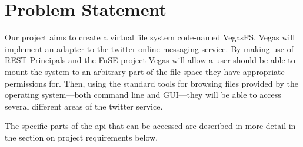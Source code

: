 \section{Problem Statement}

Our project aims to create a virtual file system code-named VegasFS. Vegas will
implement an adapter to the twitter online messaging service. By making use of
REST Principals and the FuSE project Vegas will allow a user should be able to
mount the system to an arbitrary part of the file space they have appropriate
permissions for. Then, using the standard tools for browsing files provided by
the operating system---both command line and GUI---they will be able to access
several different areas of the twitter service.

The specific parts of the api that can be accessed are described in more detail
in the section on project requirements below.

